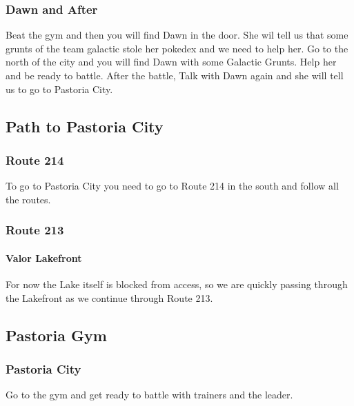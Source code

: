 \documentclass[11pt]{article}
\begin{document}
\subsubsection{Dawn and After}\label{subsubsec:dawn-and-after}
Beat the gym and then you will find Dawn in the door.
She wil tell us that some grunts of the team galactic stole her pokedex and we need to help her.
Go to the north of the city and you will find Dawn with some Galactic Grunts.
Help her and be ready to battle.
After the battle, Talk with Dawn again and she will tell us to go to Pastoria City.

\subsection{Path to Pastoria City}\label{subsec:path-to-pastoria-city}

\subsubsection{Route 214}\label{subsubsec:route_214}

To go to Pastoria City you need to go to Route 214 in the south and follow all the routes.





\subsubsection{Route 213}\label{subsubsec:route_213}

\paragraph{Valor Lakefront} For now the Lake itself is blocked from access, so
we are quickly passing through the Lakefront as we continue through Route 213.





\subsection{Pastoria Gym}\label{subsec:pastoria-gym}

\subsubsection{Pastoria City}\label{subsubsec:pastoria-city}
Go to the gym and get ready to battle with trainers and the leader.
\end{document}
